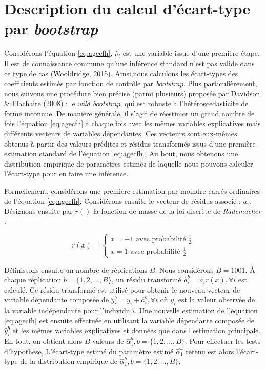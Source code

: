 \documentclass[
]{book}
\begin{document}
\setcounter{table}{0}
\setcounter{figure}{0}

\hypertarget{agewbootdesc}{%
\section{\texorpdfstring{Description du calcul d'écart-type par \emph{bootstrap}}{Description du calcul d'écart-type par bootstrap}}\label{agewbootdesc}}

Considérons l'équation \eqref{eq:agecfh}. \(\hat{\nu}_{i}\) est une variable issue d'une première étape. Il est de connaissance commune qu'une inférence standard n'est pas valide dans ce type de cas (\protect\hyperlink{ref-WOO:15}{Wooldridge, 2015}). Ainsi,nous calculons les écart-types des coefficients estimés par fonction de contrôle par \emph{bootstrap}. Plus particulièrement, nous suivons une procédure bien précise (parmi plusieurs) proposée par Davidson \& Flachaire (\protect\hyperlink{ref-DAV:FLA:08}{2008}) : le \emph{wild bootstrap}, qui est robuste à l'hétéroscédasticité de forme inconnue. De manière générale, il s'agit de réestimer un grand nombre de fois l'équation \eqref{eq:agecfh} à chaque fois avec les mêmes variables explicatives mais différents vecteurs de variables dépendantes. Ces vecteurs sont eux-mêmes obtenus à partir des valeurs prédites et résidus transformés issus d'une première estimation standard de l'équation \eqref{eq:agecfh}. Au bout, nous obtenons une distribution empirique de paramètres estimés de laquelle nous pouvons calculer l'écart-type pour en faire une inférence.

\quad Formellement, considérons une première estimation par moindre carrés ordinaires de l'équation \eqref{eq:agecfh}. Considérons ensuite le vecteur de résidus associé : \(\hat{a}_{i}\). Désignons ensuite par \(r()\) la fonction de masse de la loi discrète de \emph{Rademacher} :

\[
r(x) = 
\begin{cases} 
x = - 1 \text{ avec probabilité } \frac{1}{2} \\
x = 1 \text{ avec probabilité } \frac{1}{2} 
\end{cases}
\]

Définissons ensuite un nombre de réplications \(B\). Nous considérons \(B = 1001\). À chaque réplication \(b = \{1, 2, ..., B\}\), un résidu transformé \(\hat{a}^b_i = \hat{a}_i r(x), \forall i\) est calculé. Ce résidu transformé est utilisé pour obtenir le nouveau vecteur de variable dépendante composée de \(\hat{y}^b_i = y_i + \hat{a}^b_i, \forall i\) où \(y_i\) est la valeur observée de la variable indépendante pour l'individu \(i\). Une nouvelle estimation de l'équation \eqref{eq:agecfh} est ensuite effectuée en utilisant la variable dépendante composée de \(\hat{y}^b_i\) et les mêmes variables explicatives et données que dans l'estimation principale.\\
En tout, on obtient alors \(B\) valeurs de \(\hat{\alpha}_1^b, b = \{1, 2, ..., B\}\). Pour effectuer les tests d'hypothèse, L'écart-type estimé du paramètre estimé \(\hat{\alpha_1}\) retenu est alors l'écart-type de la distribution empirique de \(\hat{\alpha}_1^b, b = \{1, 2, ..., B\}\).
\end{document}
